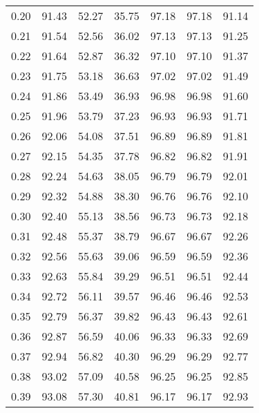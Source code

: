 \begin{tabular}{|c|c|c|c|c|c|c|}
      0.20 &     91.43 &     52.27 &      35.75 &   97.18 &      97.18 &         91.14 \\
      0.21 &     91.54 &     52.56 &      36.02 &   97.13 &      97.13 &         91.25 \\
      0.22 &     91.64 &     52.87 &      36.32 &   97.10 &      97.10 &         91.37 \\
      0.23 &     91.75 &     53.18 &      36.63 &   97.02 &      97.02 &         91.49 \\
      0.24 &     91.86 &     53.49 &      36.93 &   96.98 &      96.98 &         91.60 \\
      0.25 &     91.96 &     53.79 &      37.23 &   96.93 &      96.93 &         91.71 \\
      0.26 &     92.06 &     54.08 &      37.51 &   96.89 &      96.89 &         91.81 \\
      0.27 &     92.15 &     54.35 &      37.78 &   96.82 &      96.82 &         91.91 \\
      0.28 &     92.24 &     54.63 &      38.05 &   96.79 &      96.79 &         92.01 \\
      0.29 &     92.32 &     54.88 &      38.30 &   96.76 &      96.76 &         92.10 \\
      0.30 &     92.40 &     55.13 &      38.56 &   96.73 &      96.73 &         92.18 \\
      0.31 &     92.48 &     55.37 &      38.79 &   96.67 &      96.67 &         92.26 \\
      0.32 &     92.56 &     55.63 &      39.06 &   96.59 &      96.59 &         92.36 \\
      0.33 &     92.63 &     55.84 &      39.29 &   96.51 &      96.51 &         92.44 \\
      0.34 &     92.72 &     56.11 &      39.57 &   96.46 &      96.46 &         92.53 \\
      0.35 &     92.79 &     56.37 &      39.82 &   96.43 &      96.43 &         92.61 \\
      0.36 &     92.87 &     56.59 &      40.06 &   96.33 &      96.33 &         92.69 \\
      0.37 &     92.94 &     56.82 &      40.30 &   96.29 &      96.29 &         92.77 \\
      0.38 &     93.02 &     57.09 &      40.58 &   96.25 &      96.25 &         92.85 \\
      0.39 &     93.08 &     57.30 &      40.81 &   96.17 &      96.17 &         92.93 \\

\end{tabular}
